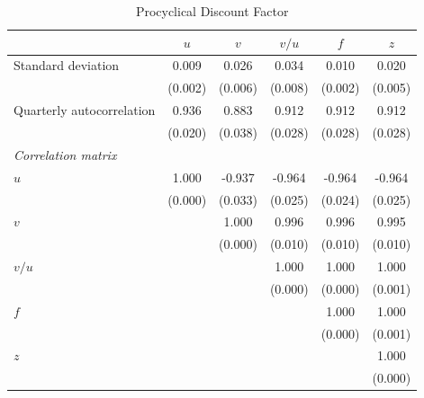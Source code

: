\begin{table}[ht]
\centering
\caption{Procyclical Discount Factor}
\label{tab:proc_beta}
\begin{tabular}{lccccc}
\toprule
 & $u$ & $v$ & $v/u$ & $f$ & $z$ \\
\midrule
Standard deviation & 0.009 & 0.026 & 0.034 & 0.010 & 0.020 \\
 & (0.002) & (0.006) & (0.008) & (0.002) & (0.005) \\
\addlinespace
Quarterly autocorrelation & 0.936 & 0.883 & 0.912 & 0.912 & 0.912 \\
 & (0.020) & (0.038) & (0.028) & (0.028) & (0.028) \\
\midrule
\multicolumn{6}{l}{\textit{Correlation matrix}} \\
\addlinespace
$u$ & 1.000 & -0.937 & -0.964 & -0.964 & -0.964 \\
 & (0.000) & (0.033) & (0.025) & (0.024) & (0.025) \\
\addlinespace
$v$ &  & 1.000 & 0.996 & 0.996 & 0.995 \\
 &  & (0.000) & (0.010) & (0.010) & (0.010) \\
\addlinespace
$v/u$ &  &  & 1.000 & 1.000 & 1.000 \\
 &  &  & (0.000) & (0.000) & (0.001) \\
\addlinespace
$f$ &  &  &  & 1.000 & 1.000 \\
 &  &  &  & (0.000) & (0.001) \\
\addlinespace
$z$ &  &  &  &  & 1.000 \\
 &  &  &  &  & (0.000) \\
\bottomrule
\end{tabular}
\end{table}
